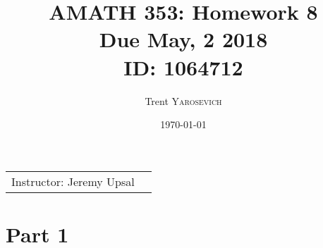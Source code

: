 \documentclass{article}
\title{AMATH 353: Homework 8 \\Due May, 2 2018 \\ ID: 1064712} %
\author{Trent \textsc{Yarosevich}} %
\date{\today} %
\begin{document}
\maketitle %
\setlength\parindent{1cm}

\begin{center}
\begin{tabular}{l r}
Instructor: Jeremy Upsal %
\end{tabular}
\end{center}


\section*{Part 1}
\end{document}
